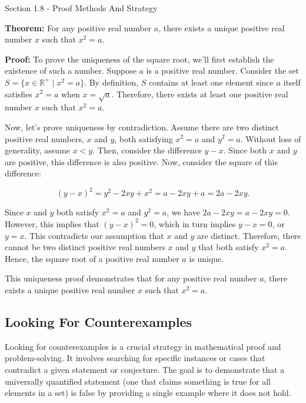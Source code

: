 \begin{notes}{Section 1.8 - Proof Methods And Strategy}
    \begin{Highlight}
        \textbf{Theorem:} For any positive real number \(a\), there exists a unique positive real number \(x\) such that \(x^2 = a\).
    
    
        \textbf{Proof:} To prove the uniqueness of the square root, we'll first establish the existence of such a number. Suppose \(a\) is a positive real number. Consider the set \(S = \{x \in \mathbb{R}^+ \mid x^2 = a\}\). 
        By definition, \(S\) contains at least one element since \(a\) itself satisfies \(x^2 = a\) when \(x = \sqrt{a}\). Therefore, there exists at least one positive real number \(x\) such that \(x^2 = a\).
    
        Now, let's prove uniqueness by contradiction. Assume there are two distinct positive real numbers, \(x\) and \(y\), both satisfying \(x^2 = a\) and \(y^2 = a\). Without loss of generality, assume \(x < y\). Then, consider 
        the difference \(y - x\). Since both \(x\) and \(y\) are positive, this difference is also positive. Now, consider the square of this difference:
        
        \[(y - x)^2 = y^2 - 2xy + x^2 = a - 2xy + a = 2a - 2xy.\]
    
        Since \(x\) and \(y\) both satisfy \(x^2 = a\) and \(y^2 = a\), we have \(2a - 2xy = a - 2xy = 0\). However, this implies that \((y - x)^2 = 0\), which in turn implies \(y - x = 0\), or \(y = x\). This contradicts our 
        assumption that \(x\) and \(y\) are distinct. Therefore, there cannot be two distinct positive real numbers \(x\) and \(y\) that both satisfy \(x^2 = a\). Hence, the square root of a positive real number \(a\) is unique.
    
        
        This uniqueness proof demonstrates that for any positive real number \(a\), there exists a unique positive real number \(x\) such that \(x^2 = a\).
    \end{Highlight}
    
    \subsection*{Looking For Counterexamples}

    Looking for counterexamples is a crucial strategy in mathematical proof and problem-solving. It involves searching for specific instances or cases that contradict a given statement or conjecture. The goal is to demonstrate 
    that a universally quantified statement (one that claims something is true for all elements in a set) is false by providing a single example where it does not hold.


\end{notes}
